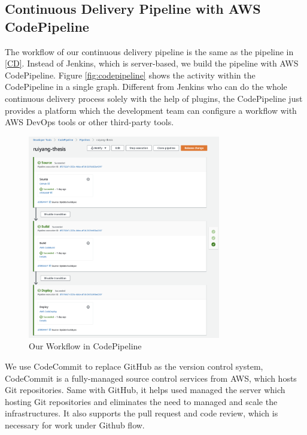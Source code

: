 \subsection{Continuous Delivery Pipeline with AWS CodePipeline}
The workflow of our continuous delivery pipeline is the same as the pipeline in \ref{CD}. Instead of Jenkins, which is server-based, we build the pipeline with AWS CodePipeline. Figure \ref{fig:codepipeline} shows the activity within the CodePipeline in a single graph. Different from Jenkins who can do the whole continuous delivery process solely with the help of plugins, the CodePipeline just provides a platform which the development team can configure a workflow with AWS DevOps tools or other third-party tools. 
\begin{figure}[h]
     \centering
     \includegraphics[width=0.75\textwidth]{pics/cp-interface.png}
     \caption{Our Workflow in CodePipeline}
     \label{fig:cp-edit}
    \end{figure}
\par
We use CodeCommit to replace GitHub as the version control system, CodeCommit is a fully-managed source control services \cite{AWSCodeC33:online} from AWS, which hosts Git repositories. Same with GitHub, it helps used managed the server which hosting Git repositories and eliminates the need to managed and scale the infrastructures. It also supports the pull request and code review, which is necessary for work under Github flow. 
